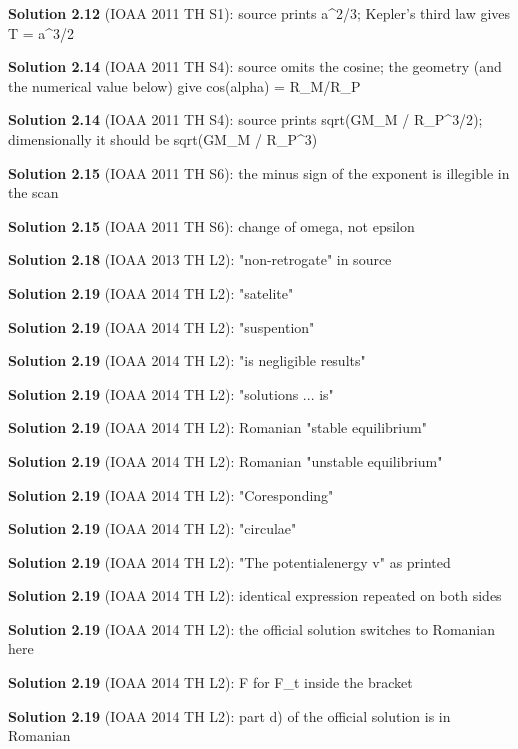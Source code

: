 \noindent\textbf{Solution 2.12} (IOAA 2011 TH S1): source prints a\^{}{2/3}; Kepler's third law gives T = a\^{}{3/2}
\smallskip

\noindent\textbf{Solution 2.14} (IOAA 2011 TH S4): source omits the cosine; the geometry (and the numerical value below) give cos(alpha) = R\_M/R\_P
\smallskip

\noindent\textbf{Solution 2.14} (IOAA 2011 TH S4): source prints sqrt(GM\_M / R\_P\^{}{3/2}); dimensionally it should be sqrt(GM\_M / R\_P\^{}3)
\smallskip

\noindent\textbf{Solution 2.15} (IOAA 2011 TH S6): the minus sign of the exponent is illegible in the scan
\smallskip

\noindent\textbf{Solution 2.15} (IOAA 2011 TH S6): change of omega, not epsilon
\smallskip

\noindent\textbf{Solution 2.18} (IOAA 2013 TH L2): "non-retrogate" in source
\smallskip

\noindent\textbf{Solution 2.19} (IOAA 2014 TH L2): "satelite"
\smallskip

\noindent\textbf{Solution 2.19} (IOAA 2014 TH L2): "suspention"
\smallskip

\noindent\textbf{Solution 2.19} (IOAA 2014 TH L2): "is negligible results"
\smallskip

\noindent\textbf{Solution 2.19} (IOAA 2014 TH L2): "solutions ... is"
\smallskip

\noindent\textbf{Solution 2.19} (IOAA 2014 TH L2): Romanian "stable equilibrium"
\smallskip

\noindent\textbf{Solution 2.19} (IOAA 2014 TH L2): Romanian "unstable equilibrium"
\smallskip

\noindent\textbf{Solution 2.19} (IOAA 2014 TH L2): "Coresponding"
\smallskip

\noindent\textbf{Solution 2.19} (IOAA 2014 TH L2): "circulae"
\smallskip

\noindent\textbf{Solution 2.19} (IOAA 2014 TH L2): "The potentialenergy v" as printed
\smallskip

\noindent\textbf{Solution 2.19} (IOAA 2014 TH L2): identical expression repeated on both sides
\smallskip

\noindent\textbf{Solution 2.19} (IOAA 2014 TH L2): the official solution switches to Romanian here
\smallskip

\noindent\textbf{Solution 2.19} (IOAA 2014 TH L2): F for F\_t inside the bracket
\smallskip

\noindent\textbf{Solution 2.19} (IOAA 2014 TH L2): part d) of the official solution is in Romanian
\smallskip

